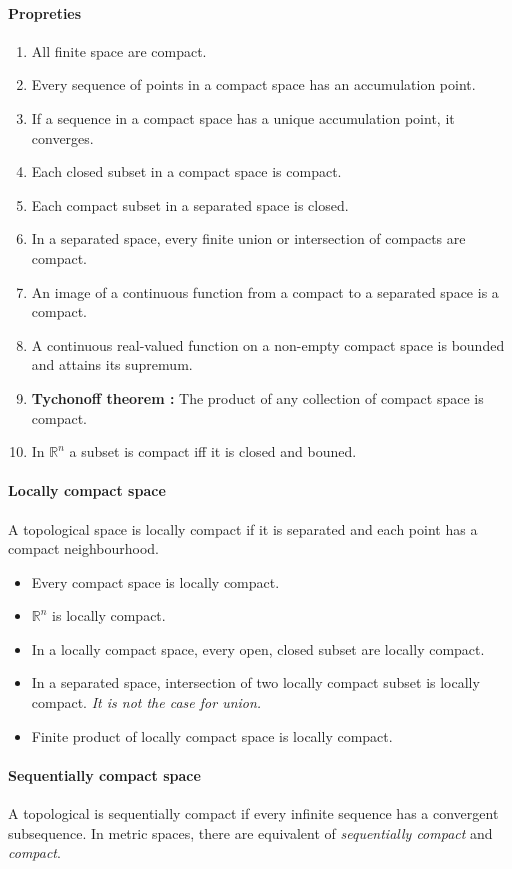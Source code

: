 \documentclass[a4paper,10pt]{article}
\begin{document}
\paragraph{Propreties}
\begin{enumerate}
 \item All finite space are compact.
 \item Every sequence of points in a compact space has an accumulation point.
 \item If a sequence in a compact space has a unique accumulation point, it converges.
 \item Each closed subset in a compact space is compact.
 \item Each compact subset in a separated space is closed.
 \item In a separated space, every finite union or intersection of compacts are compact.
 \item An image of a continuous function from a compact to a separated space is a compact.
 \item A continuous real-valued function on a non-empty compact space is bounded and attains its supremum.
 \item \textbf{Tychonoff theorem : } The product of any collection of compact space is compact.
 \item In $\mathbb{R}^n$ a subset is compact iff it is closed and bouned.   
\end{enumerate}

\paragraph{Locally compact space} A topological space is locally compact if it is separated and each point has a compact neighbourhood.
\begin{itemize}
 \item Every compact space is locally compact.
 \item $\mathbb{R}^n$ is locally compact.
 \item In a locally compact space, every open, closed subset are locally compact.
 \item In a separated space, intersection of two locally compact subset is locally compact.\textit{ It is not the case for union.}
 \item Finite product of locally compact space is locally compact.
\end{itemize}

\paragraph{Sequentially compact space} A topological is sequentially compact if every infinite sequence has a convergent subsequence. In metric spaces, there are equivalent of \textit{sequentially compact} and \textit{compact}.  
\end{document}
